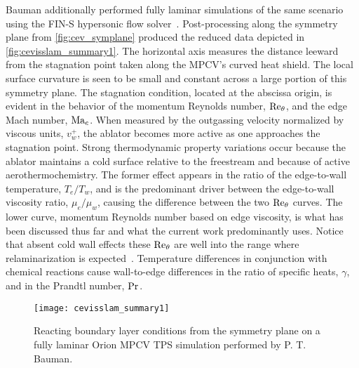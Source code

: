 Bauman additionally performed fully laminar simulations
of the same scenario using the {FIN-S} hypersonic flow
solver~\citep{Kirk2014Modeling}.  Post-processing along the symmetry
plane from \autoref{fig:cev_symplane} produced the reduced data depicted
in \autoref{fig:cevisslam_summary1}.  The horizontal axis measures
the distance leeward from the stagnation point taken along the MPCV's
curved heat shield.  The local surface curvature is seen to be small and
constant across a large portion of this symmetry plane.  The stagnation
condition, located at the abscissa origin, is evident in the behavior
of the momentum Reynolds number, $\Reynolds[\theta]{}$, and the edge
Mach number, $\Mach[e]$.  When measured by the outgassing velocity
normalized by viscous units, $v_w^{+}$, the ablator becomes more active as
one approaches the stagnation point.  Strong thermodynamic property variations
occur because the ablator maintains a cold surface relative to
the freestream and because of active aerothermochemistry.  The former
effect appears in the ratio of the edge-to-wall temperature,
$T_e/T_w$, and is the predominant driver between the edge-to-wall
viscosity ratio, $\mu_e/\mu_w$, causing the difference between the
two $\Reynolds[\theta]$ curves.  The lower curve, momentum Reynolds
number based on edge viscosity, is what has been discussed thus far
and what the current work predominantly uses.  Notice that absent cold
wall effects these $\Reynolds[\theta]$ are well into the range where
relaminarization is expected~\citep[\textsection{}3.2]{Spalart1988Direct}.
Temperature differences in conjunction with chemical reactions cause
wall-to-edge differences in the ratio of specific heats, $\gamma$, and in the
Prandtl number, $\Prandtl$.

\begin{figure}[p]
  \centering
  \texttt{[image: cevisslam\_summary1]}
  \caption[
    Reacting boundary layer conditions from the symmetry plane on a fully
    laminar Orion MPCV thermal protection system simulation
  ]{%
    \label{fig:cevisslam_summary1}
    Reacting boundary layer conditions from the symmetry plane on a fully
    laminar Orion MPCV TPS simulation performed by P. T. Bauman.
  }
\end{figure}

